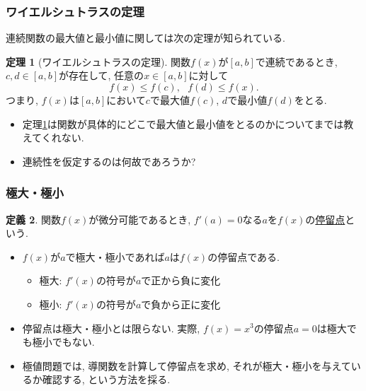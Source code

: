 \documentclass[dvipdfmx,cjk,10.2pt]{beamer}
\theoremstyle{definition}
\newtheorem{Thm}{定理}[section]
\newtheorem{Def}[Thm]{定義}
\begin{document}
\begin{frame}
\frametitle{ワイエルシュトラスの定理}



連続関数の最大値と最小値に関しては次の定理が知られている. 

\begin{Thm}[ワイエルシュトラスの定理] \label{Weierstrass}
関数$f(x)$が$[a,b]$で連続であるとき, $c,d\in [a,b]$が存在して, 任意の$x \in [a,b]$に対して
$$
f(x) \le f(c), \ \ \ f(d) \le f(x). 
$$
つまり, $f(x)$は$[a,b]$において$c$で最大値$f(c)$, $d$で最小値$f(d)$をとる. 
\end{Thm}
\begin{itemize}
\item 定理\ref{Weierstrass}は関数が具体的にどこで最大値と最小値をとるのかについてまでは教えてくれない. 
\item 連続性を仮定するのは何故であろうか? 
\end{itemize}
\end{frame}




\begin{frame}
\frametitle{極大・極小}


\begin{Def}
関数$f(x)$が微分可能であるとき, $f'(a)=0$なる$a$を$f(x)$の\underline{停留点}という. 
\end{Def}

\begin{itemize}
\item $f(x)$が$a$で極大・極小であれば$a$は$f(x)$の停留点である. 
\begin{itemize}
\item 極大: $f'(x)$の符号が$a$で正から負に変化
\item 極小: $f'(x)$の符号が$a$で負から正に変化
\end{itemize}
\item 停留点は極大・極小とは限らない. 実際, $f(x)=x^3$の停留点$a=0$は極大でも極小でもない. 
\item 極値問題では, 導関数を計算して停留点を求め, それが極大・極小を与えているか確認する, という方法を採る. 
\end{itemize}
\end{frame}



\end{document}
